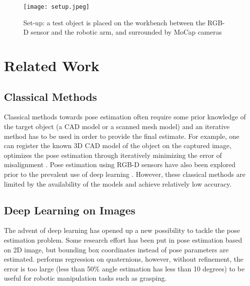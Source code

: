 \documentclass[conference]{IEEEtran}
\begin{document}

\begin{figure}[t]
 \centerline{\texttt{[image: setup.jpeg]}}
 \caption{Set-up: a test object is placed on the workbench between the RGB-D sensor and the robotic arm, and surrounded by MoCap cameras}
 \label{fig_setup}
\end{figure}


\section{Related Work}
\subsection{Classical Methods}
Classical methods towards pose estimation often require some prior knowledge of the target object (a CAD model or a scanned mesh model) and an iterative method has to be used in order to provide the final estimate. For example,  one can register the known 3D CAD model of the object on the captured image, optimizes the pose estimation through iteratively minimizing the error of misalignment \cite{jayawardena_2011_dicta}. Pose estimation using RGB-D sensors have also been explored prior to the prevalent use of deep learning \cite{choi_2012_iros}. However, these classical methods are limited by the availability of the models and achieve relatively low accuracy.


\subsection{Deep Learning on Images}
The advent of deep learning has opened up a new possibility to tackle the pose estimation problem. Some research effort has been put in pose estimation based on 2D image\cite{tremblay_2018_corl}, but bounding box coordinates instead of pose parameters are estimated. \cite{xiang_2018_rss} performs regression on quaternions, however, without refinement, the error is too large (less than 50\% angle estimation has less than 10 degrees) to be useful for robotic manipulation tasks such as grasping.
\end{document}
